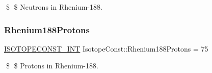 \$ \$ Neutrons in Rhenium-\/188. \mbox{\label{group___isotope_const-_rhenium-_re188_ga7abccf71dba96a28be5d51800bc3f942}} 
\subsubsection{\texorpdfstring{Rhenium188\+Protons}{Rhenium188Protons}}
{\footnotesize\ttfamily \mbox{\hyperlink{group___isotope_const-_macros_ga5f18360b3e99483a35c32d789e62621c}{I\+S\+O\+T\+O\+P\+E\+C\+O\+N\+S\+T\+\_\+\+I\+NT}} Isotope\+Const\+::\+Rhenium188\+Protons = 75}

\$ \$ Protons in Rhenium-\/188. 